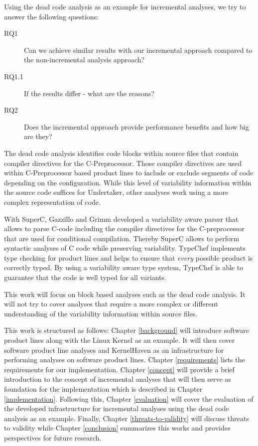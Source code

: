 \documentclass[a4paper]{article}
\begin{document}
Using the dead code analysis as an example for incremental analyses, we try to answer the following questions: 

\begin{description}
	\item[RQ1] Can we achieve similar results with our incremental approach compared to the non-incremental analysis approach?
	\item[RQ1.1] If the results differ - what are the reasons?
	\item[RQ2] Does the incremental approach provide performance benefits and how big are they?
\end{description} 

The dead code analysis identifies code blocks within source files that contain compiler directives for the C-Preprocessor. Those compiler directives are used within C-Preprocessor based product lines to include or exclude segments of code depending on the configuration. While this level of variability information within the source code suffices for Undertaker, other analyses work using a more complex representation of code. 

With SuperC, Gazzillo and Grimm \cite{gazzillo-grimm} developed a variability aware parser that allows to parse C-code including the compiler directives for the C-preprocessor that are used for conditional compilation. Thereby SuperC allows to perform syntactic analyses of C code while preserving variability. 
TypeChef \cite{Kenner:2010:TTT:1868688.1868693} implements type checking for product lines and helps to ensure that \emph{every} possible product is correctly typed.  By using a variability aware type system, TypeChef is able to guarantee that the code is well typed for all variants.

This work will focus on block based analyses such as the dead code analysis. It will not try to cover analyses that require a more complex or different understanding of the variability information within source files.

This work is structured as follows: Chapter \ref{background} will introduce software product lines along with the Linux Kernel as an example. It will then cover software product line analyses and KernelHaven as an infrastructure for performing analyses on software product lines. Chapter \ref{requirements} lists the requirements for our implementation. Chapter \ref{concept} will provide a brief introduction to the concept of incremental analyses that will then serve as foundation for the implementation which is described in Chapter \ref{implementation}. Following this, Chapter \ref{evaluation} will cover the evaluation of the developed infrastructure for incremental analyses using the dead code analysis as an example. Finally, Chapter \ref{threats-to-validity} will discuss threats to validity while Chapter \ref{conclusion} summarizes this works and provides perspectives for future research.
\end{document}
